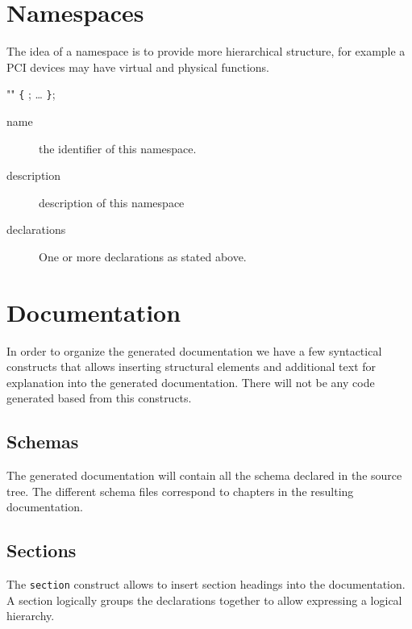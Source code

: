 \documentclass[a4paper,11pt,twoside]{report}
\begin{document}
{{\section{Namespaces}
\label{sec:decl:namespace}

The idea of a namespace is to provide more hierarchical structure, for example
a PCI devices may have virtual and physical functions.


\begin{syntax}
  "" \verb+{+
    ;
    \ldots
\verb+}+;
\end{syntax}

\begin{description}
    \item[name] the identifier of this namespace.
    
    \item[description] description of this namespace
    
    \item[declarations] One or more declarations as stated above.
\end{description}


\section{Documentation}

In order to organize the generated documentation we have a few syntactical 
constructs that allows inserting structural elements and additional text for
explanation into the generated documentation. There will not be any code 
generated based from this constructs.

\subsection{Schemas}
The generated documentation will contain all the schema declared in the source 
tree. The different schema files correspond to chapters in the resulting 
documentation.

\subsection{Sections}
\label{sec:doc:section}
The \texttt{section} construct allows to insert section headings into the 
documentation. A section logically groups the declarations together to allow
expressing a logical hierarchy. 

}}
\end{document}
